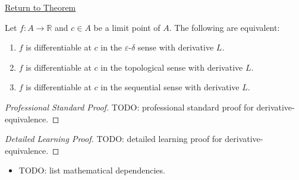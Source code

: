 \newpage
{}
\label{prf:derivative-equivalence}

\begin{remark*}[Return]
\hyperref[thm:derivative-equivalence]{Return to Theorem}
\end{remark*}

\begin{theorem*}
Let $f : A \to \mathbb{R}$ and $c \in A$ be a limit point of $A$. The following are equivalent:
\begin{enumerate}
  \item $f$ is differentiable at $c$ in the $\varepsilon$-$\delta$ sense with derivative $L$.
  \item $f$ is differentiable at $c$ in the topological sense with derivative $L$.
  \item $f$ is differentiable at $c$ in the sequential sense with derivative $L$.
\end{enumerate}
\end{theorem*}

\begin{proof}[Professional Standard Proof]
\LRAProofBodyStart
TODO: professional standard proof for derivative-equivalence.
\end{proof}

\begin{proof}[Detailed Learning Proof]
\LRAProofBodyStart
TODO: detailed learning proof for derivative-equivalence.
\end{proof}

\begin{remark*}
\end{remark*}

\begin{dependencies}
\begin{itemize}
  \item TODO: list mathematical dependencies.
\end{itemize}
\end{dependencies}

\clearpage

